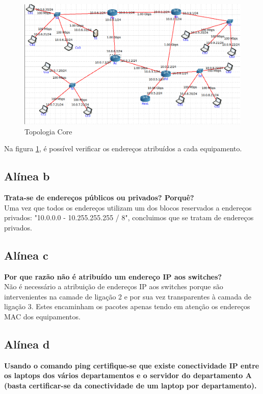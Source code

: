 \documentclass[a4paper]{report}
\begin{document}
\begin{figure}[H]
    \centering 
    \includegraphics[width=\textwidth]{images/topologiaCore.png}
    \caption{Topologia Core}
    \label{fig:topologiaCore}
\end{figure}
Na figura \ref{fig:topologiaCore}, é possível verificar os endereços atribuídos
a cada equipamento. 

\subsection{Alínea b}
\textbf{Trata-se de endereços públicos ou privados? Porquê?}\\
Uma vez que todos os endereços utilizam um dos blocos reservados a endereços
privados: "10.0.0.0 - 10.255.255.255 / 8", concluimos que se tratam de endereços
privados.

\subsection{Alínea c}
\textbf{Por que razão não é atribuído um endereço IP aos switches?}\\
Não é necessário a atribuição de endereços IP aos switches porque são 
intervenientes na camade de ligação 2 e por sua vez transparentes à camada de
ligação 3. Estes encaminham os pacotes apenas tendo em atenção os endereços MAC
dos equipamentos.\\

\subsection{Alínea d}
\textbf{Usando o comando ping certifique-se que existe conectividade IP entre 
os laptops dos vários departamentos e o servidor do departamento A 
(basta certificar-se da conectividade de um laptop por departamento).}\\
\end{document}
